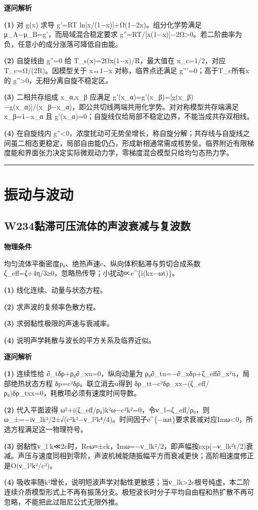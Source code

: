 \documentclass[UTF8,a4paper,11pt,oneside,openany]{ctexbook}
\begin{document}
\par\medskip\noindent\textbf{逐问解析}
\par\noindent\textbf{(1)} 对 g(x) 求导 g'=RT ln[x/(1−x)]+Ω(1−2x)。组分化学势满足 μ\_A−μ\_B=g'，而局域混合稳定要求 g''=RT/[x(1−x)]−2Ω>0。若二阶曲率为负，任意小的成分涨落可降低自由能。
\par\noindent\textbf{(2)} 自旋线由 g''=0 给 T\_s(x)=2Ωx(1−x)/R，最大值在 x\_c=1/2，对应 T\_c=Ω/(2R)。因模型关于 x↔1−x 对称，临界点还满足 g'''=0；高于T\_c所有x的 g''>0，无相分离自旋不稳定区。
\par\noindent\textbf{(3)} 二相共存组成 x\_α,x\_β 应满足 g'(x\_α)=g'(x\_β)=[g(x\_β)−g(x\_α)]/(x\_β−x\_α)，即公共切线两端共用化学势。对对称模型共存端满足 x\_β=1−x\_α 且 g'(x\_α)=0；自旋线仅给局部不稳定边界，不能当成共存双相线。
\par\noindent\textbf{(4)} 在自旋线内 g''<0，浓度扰动可无势垒增长，称自旋分解；共存线与自旋线之间虽二相态更稳定，局部自由能仍凸，形成新相通常需成核势垒。临界附近有限梯度能和界面张力决定实际微观动力学，零梯度混合模型只给均匀态热力学。

\par\bigskip\hrule\bigskip
\chapter{振动与波动}
\section*{W234\quad 黏滞可压流体的声波衰减与复波数}
\textbf{物理条件}\par 均匀流体平衡密度ρ₀、绝热声速c、纵向体积黏滞与剪切合成系数ζ\_eff=ζ+4η/3≥0，忽略热传导；小扰动∝e\textasciicircum{}\{i(kx−ωt)\}。
\par\noindent\textbf{(1)} 线化连续、动量与状态方程。
\par\noindent\textbf{(2)} 求声波的复频率色散方程。
\par\noindent\textbf{(3)} 求弱黏性极限的声速与衰减率。
\par\noindent\textbf{(4)} 说明声学耗散与波长的平方关系及临界近似。

\par\medskip\noindent\textbf{逐问解析}
\par\noindent\textbf{(1)} 连续性给 ∂\_tδρ+ρ₀∂\_xu=0，纵向动量为 ρ₀∂\_tu=−∂\_xδp+ζ\_eff∂\_x²u，局部绝热状态方程 δp=c²δρ。联立消去u得到 δρ\_tt−c²δρ\_xx−(ζ\_eff/ρ₀)δρ\_txx=0，耗散项必须有速度时间导数。
\par\noindent\textbf{(2)} 代入平面波得 ω²+i(ζ\_eff/ρ₀)k²ω−c²k²=0，令ν\_l=ζ\_eff/ρ₀，则 ω\_±=−iν\_lk²/2±√(c²k²−ν\_l²k⁴/4)。时间因子e\textasciicircum{}\{−iωt\}要求衰减对应Imω<0，所选方程满足这一物理符号。
\par\noindent\textbf{(3)} 弱黏性ν\_l k≪2c时，Reω≈±ck，Imω=−ν\_lk²/2，即声幅按exp(−ν\_lk²t/2)衰减。声压与速度同相到零阶，声波机械能随振幅平方而衰减更快；高阶相速度修正是O(ν\_l²k²/c²)。
\par\noindent\textbf{(4)} 吸收率随k²增长，说明短波声学对黏性更敏感；当ν\_lk>2c根号纯虚，本二阶连续介质模型形式上不再有振荡分支。极短波长时分子平均自由程和热扩散不再可忽略，不能把此过阻尼公式无限外推。
\end{document}
